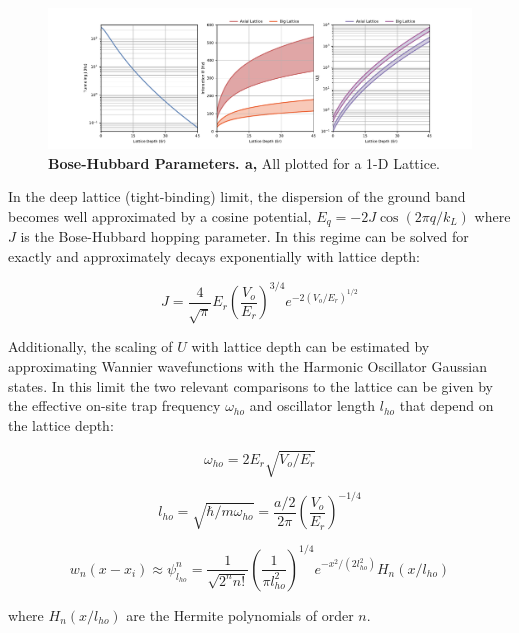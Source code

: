 \begin{figure}[ht!]
		\includegraphics[width=\columnwidth]{figures/ch1/BHParams/BHParams.pdf} 
		\caption{\textbf{Bose-Hubbard Parameters. a,}  All plotted for a 1-D Lattice.}
		\label{fig:BHP}	
\end{figure}

In the deep lattice (tight-binding) limit, the dispersion of the ground band becomes well approximated by a cosine potential, $E_q = - 2 J \cos{\left (2 \pi q/k_L \right )}$ where $J$ is the Bose-Hubbard hopping parameter. In this regime can be solved for exactly and approximately decays exponentially with lattice depth:

\begin{equation}
\label{eqn:tightJ}
J = \frac{4}{\sqrt{\pi}} E_r \left ( \frac{V_o}{E_r}  \right )^{3/4} e^{-2 (V_o/E_r)^{1/2}}
\end{equation}

 Additionally, the scaling of $U$ with lattice depth can be estimated by approximating Wannier wavefunctions with the Harmonic Oscillator Gaussian states. In this limit the two relevant comparisons to the lattice can be given by the effective on-site trap frequency $\omega_{ho}$ and oscillator length $l_{ho}$ that depend on the lattice depth:
 
\begin{equation}
\label{eqn:w_ho}
\omega_{ho} = 2 E_r \sqrt{V_o/ E_r}
\end{equation}

\begin{equation}
\label{eqn:l_ho}
l_{ho}=\sqrt{\hbar / m \omega_{ho}} = \frac{a/2}{2\pi} \left ( \frac{V_o}{E_r} \right )^{-1/4}
\end{equation}

\begin{equation}
\label{eqn:wnHO}
w_n(x-x_i) \approx \psi_{l_{ho}}^n = \frac{1}{\sqrt{2^n n!}} \left ( \frac{1}{\pi l_{ho}^2} \right )^{1/4} e^{-x^2/(2 l_{ho}^2)} H_n (x / l_{ho})
\end{equation}

where $H_n(x/l_{ho})$ are the Hermite polynomials of order $n$.


